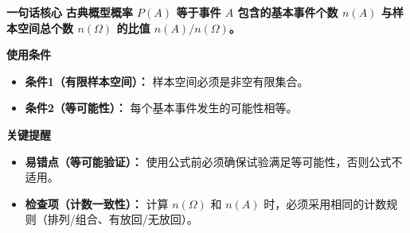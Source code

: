 \begin{summarybox}
	\textbf{\textcolor{CSummary}{一句话核心}}
	\textbf{古典概型概率 $P(A)$ 等于事件 $A$ 包含的基本事件个数 $n(A)$ 与样本空间总个数 $n(\Omega)$ 的比值 $n(A)/n(\Omega)$。}

	\medskip
	\textbf{\textcolor{CSummary}{使用条件}}
	\begin{itemize}[leftmargin=*, itemsep=0.5em, topsep=0.4em]
		\item \textbf{条件1（有限样本空间）：} 样本空间必须是非空有限集合。
		\item \textbf{条件2（等可能性）：} 每个基本事件发生的可能性相等。
	\end{itemize}

	\medskip
	\textbf{\textcolor{CSummary}{关键提醒}}
	\begin{itemize}[leftmargin=*, itemsep=0.5em, topsep=0.4em]
		\item \textbf{易错点（等可能验证）：} 使用公式前必须确保试验满足等可能性，否则公式不适用。
		\item \textbf{检查项（计数一致性）：} 计算 $n(\Omega)$ 和 $n(A)$ 时，必须采用相同的计数规则（排列/组合、有放回/无放回）。
	\end{itemize}

\end{summarybox}
